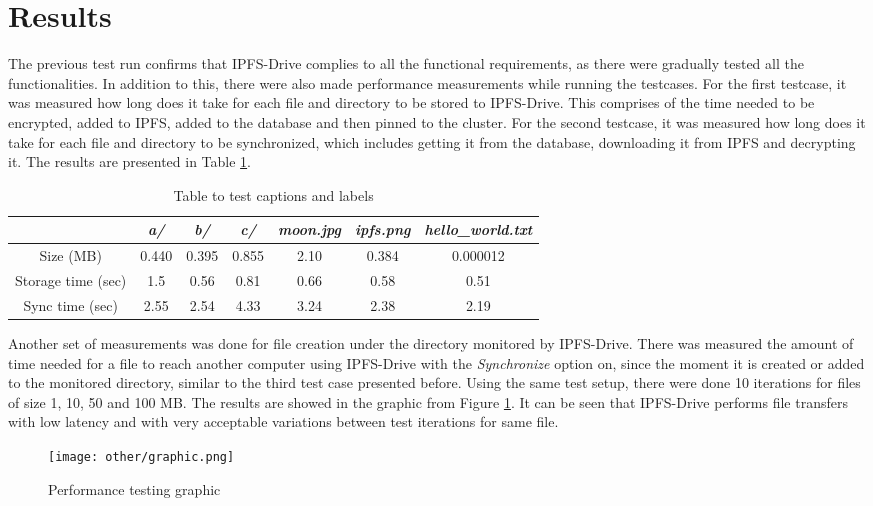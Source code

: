\documentclass[12pt]{report}
\begin{document}
\section{Results}

The previous test run confirms that IPFS-Drive complies to all the functional requirements, as there were gradually tested all the functionalities. In addition to this, there were also made performance measurements while running the testcases. For the first testcase, it was measured how long does it take for each file and directory to be stored to IPFS-Drive. This comprises of the time needed to be encrypted, added to IPFS, added to the database and then pinned to the cluster. For the second testcase, it was measured how long does it take for each file and directory to be synchronized, which includes getting it from the database, downloading it from IPFS and decrypting it. The results are presented in Table \ref{table:perf}.

\begin{table}[H]
\centering
\begin{tabular}{|c | c c c c c c|} 
 \hline
	& \textit{a/} & \textit{b/} & \textit{c/} & \textit{moon.jpg} & \textit{ipfs.png} & \textit{hello\_world.txt} \\ [0.5ex] 
 \hline \hline
Size (MB) & 0.440 & 0.395 & 0.855 & 2.10 & 0.384 & 0.000012 \\
\hline
Storage time (sec) & 1.5 & 0.56 & 0.81 & 0.66 & 0.58 & 0.51 \\
\hline
Sync time (sec) & 2.55 & 2.54 & 4.33 & 3.24 & 2.38 & 2.19 \\
 \hline
\end{tabular}
\caption{Table to test captions and labels}
\label{table:perf}
\end{table}

Another set of measurements was done for file creation under the directory monitored by IPFS-Drive. There was measured the amount of time needed for a file to reach another computer using IPFS-Drive with the \textit{Synchronize} option on, since the moment it is created or added to the monitored directory, similar to the third test case presented before. Using the same test setup, there were done 10 iterations for files of size 1, 10, 50 and 100 MB. The results are showed in the graphic from Figure \ref{fig:perfgraph}. It can be seen that IPFS-Drive performs file transfers with low latency and with very acceptable variations between test iterations for same file.


\begin{figure}[H]
\centerline{\texttt{[image: other/graphic.png]}}
    \caption{Performance testing graphic}
    \label{fig:perfgraph}
\end{figure}
\end{document}
